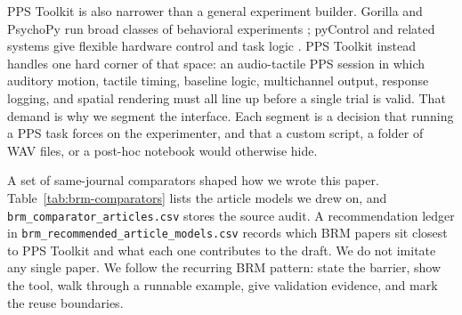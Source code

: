 \documentclass[pdflatex,sn-apa]{sn-jnl}
\newcommand{\toolkit}{PPS Toolkit}
\newcommand{\code}[1]{\texttt{#1}}
\begin{document}
\toolkit{} is also narrower than a general experiment builder. Gorilla and PsychoPy run broad classes of behavioral experiments \citep{AnwylIrvine2018,Peirce2019}; pyControl and related systems give flexible hardware control and task logic \citep{Akam2022}. \toolkit{} instead handles one hard corner of that space: an audio-tactile PPS session in which auditory motion, tactile timing, baseline logic, multichannel output, response logging, and spatial rendering must all line up before a single trial is valid. That demand is why we segment the interface. Each segment is a decision that running a PPS task forces on the experimenter, and that a custom script, a folder of WAV files, or a post-hoc notebook would otherwise hide.

A set of same-journal comparators shaped how we wrote this paper. Table~\ref{tab:brm-comparators} lists the article models we drew on, and \code{brm\_comparator\_articles.csv} stores the source audit. A recommendation ledger in \code{brm\_recommended\_article\_models.csv} records which BRM papers sit closest to \toolkit{} and what each one contributes to the draft. We do not imitate any single paper. We follow the recurring BRM pattern: state the barrier, show the tool, walk through a runnable example, give validation evidence, and mark the reuse boundaries.
\end{document}

